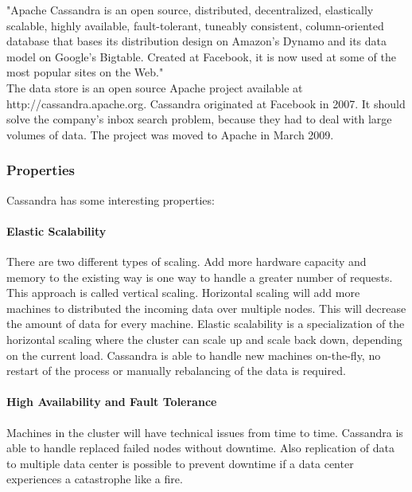 \documentclass[a4paper]{article}
\begin{document}
"Apache Cassandra is an open source, distributed, decentralized, elastically scalable, highly  available, fault-tolerant, tuneably consistent, column-oriented database that bases its distribution design on Amazon's Dynamo and its data model on Google's Bigtable. Created at Facebook, it is now used at some of the most popular sites on the Web."\\

The data store is an open source Apache project available at http://cassandra.apache.org. Cassandra originated at Facebook in 2007. It should solve the company's inbox search problem, because they had to deal with large volumes of data. The project was moved to Apache in March 2009.

\subsubsection{Properties}
Cassandra has some interesting properties:

\paragraph{Elastic Scalability }
There are two different types of scaling. Add more hardware capacity and memory to the existing way is one way to handle a greater number of requests. This approach is called vertical scaling. Horizontal scaling will add more machines to distributed the incoming data over multiple nodes. This will decrease the amount of data for every machine. Elastic scalability is a specialization of the horizontal scaling where the cluster can scale up and scale back down, depending on the current load. Cassandra is able to handle new machines on-the-fly, no restart of the process or manually rebalancing of the data is required. 
\paragraph{High Availability and Fault Tolerance}
Machines in the cluster will have technical issues from time to time. Cassandra is able to handle replaced failed nodes without downtime. Also replication of data to multiple data center is possible to prevent downtime if a data center experiences a catastrophe like a fire. 
\end{document}
